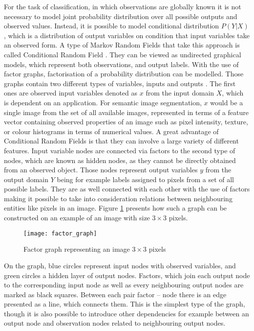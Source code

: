 For the task of classification, in which observations are globally known it is not necessary to model joint probability distribution over all possible outputs and observed values. Instead, it is possible to model conditional distribution $P(Y|X)$, which is a distribution of output variables on condition that input variables take an observed form.  A type of Markov Random Fields that take this approach is called Conditional Random Field \cite{crf_lafferty}. They can be viewed as undirected graphical models, which represent both observations, and output labels. With the use of factor graphs, factorisation of a probability distribution can be modelled. Those graphs contain two different types of variables, inputs and outputs \cite{crf_sutton}. The first ones are observed input variables denoted as $x$ from the input domain $X$, which is dependent on an application. For semantic image segmentation, $x$ would be a single image from the set of all available images, represented in terms of a feature vector containing observed properties of an image such as pixel intensity, texture, or colour histograms in terms of numerical values. A great advantage of Conditional Random Fields is that they can involve a large variety of different features. Input variable nodes are connected via factors to the second type of nodes, which are known as hidden nodes, as they cannot be directly obtained from an observed object. Those nodes represent output variables $y$ from the output domain $Y$ being for example labels assigned to pixels from a set of all possible labels. They are as well connected with each other with the use of factors making it possible to take into consideration relations between neighbouring entities like pixels in an image. Figure \ref{fig:factor_graph} presents how such a graph can be constructed on an example of an image with size $3\times3$ pixels.
\begin{figure}[h]
    \centering
    \texttt{[image: factor\_graph]}
    \caption{Factor graph representing an image $3\times3$ pixels }
     \label{fig:factor_graph}
\end{figure}
On the graph, blue circles represent input nodes with observed variables, and green circles a hidden layer of output nodes. Factors, which join each output node to the corresponding input node as well as every neighbouring output nodes are marked as black squares. Between each pair factor – node there is an edge presented as a line, which connects them. This is the simplest type of the graph, though it is also possible to introduce other dependencies for example between an output node and observation nodes related to neighbouring output nodes. 
